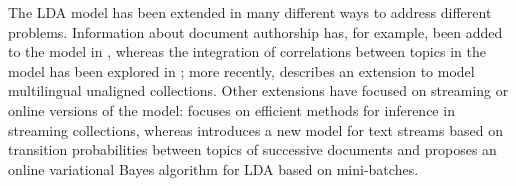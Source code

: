
The LDA model \cite{blei_latent_2003} has been extended in many different ways to address different problems. Information about document authorship has, for example, been added to the model in \cite{Rosen_Zvi_2004}, whereas the integration of correlations between topics in the model has been explored in \cite{blei_correlated_2007}; more recently, \cite{Boyd_Graber_2009} describes an extension to model multilingual unaligned collections. Other extensions have focused on streaming or online versions of the model: \cite{Yao_2009} focuses on efficient methods for inference in streaming collections, whereas \cite{Wang_2012} introduces a new model for text streams based on transition probabilities between topics of successive documents and \cite{hoffman_online_2010} proposes an online variational Bayes algorithm for LDA based on mini-batches.



